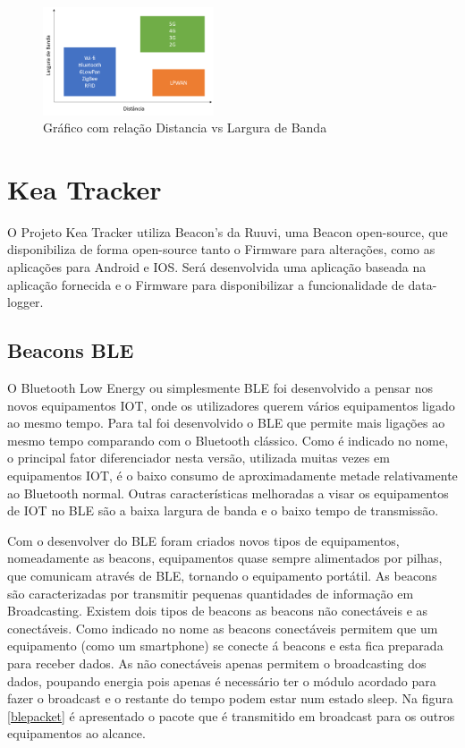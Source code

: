 \begin{figure}[ht]
\centering
\includegraphics[width=0.45\textwidth]{images/lpwan.png}
\caption{Gráfico com relação Distancia vs Largura de Banda\cite{masterthesisLPWAN}}\label{figgraphlpwan}
\end{figure}



\section {Kea Tracker}\label{kea}
O Projeto Kea Tracker utiliza Beacon’s da Ruuvi, uma Beacon open-source\cite{ruuvi}, que disponibiliza de forma open-source tanto o Firmware para alterações, como as aplicações para Android e IOS. Será desenvolvida uma aplicação baseada na aplicação fornecida e o Firmware para disponibilizar a funcionalidade de data-logger.
\subsection{Beacons BLE}
\par
O Bluetooth Low Energy ou simplesmente BLE foi desenvolvido a pensar nos novos equipamentos IOT, onde os utilizadores querem vários equipamentos ligado ao mesmo tempo. Para tal foi desenvolvido o BLE que permite mais ligações ao mesmo tempo comparando com o Bluetooth clássico.
Como é indicado no nome, o principal fator diferenciador nesta versão, utilizada muitas vezes em equipamentos IOT, é o baixo consumo de aproximadamente metade relativamente ao Bluetooth normal. Outras características melhoradas a visar os equipamentos de IOT no BLE são a baixa largura de banda e o baixo tempo de transmissão.

Com o desenvolver do BLE foram criados novos tipos de equipamentos, nomeadamente as beacons, equipamentos quase sempre alimentados por pilhas, que comunicam através de BLE, tornando o equipamento portátil. As beacons são caracterizadas por transmitir pequenas quantidades de informação em Broadcasting.
Existem dois tipos de beacons as beacons não conectáveis e as conectáveis\cite{blepacket}. Como indicado no nome as beacons conectáveis permitem que um equipamento (como um smartphone) se conecte á beacons e esta fica preparada para receber dados. As não conectáveis apenas permitem o broadcasting dos dados, poupando energia pois apenas é necessário ter o módulo acordado para fazer o broadcast e o restante do tempo podem estar num estado sleep. Na figura \ref{blepacket} é apresentado o pacote que é transmitido em broadcast para os outros equipamentos ao alcance.

